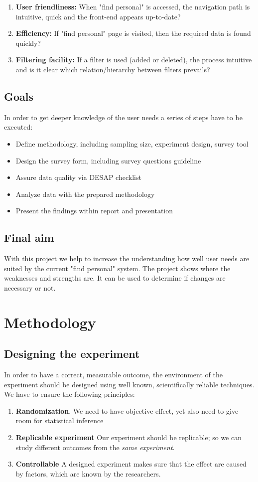 \documentclass[12pt,a4paper,paper=a4,oneside,titlepage,pdftex]{scrartcl}
\begin{document}
\begin{enumerate}
	\item \textbf{User friendliness:} When "find personal" is accessed, the navigation path is intuitive, quick and the front-end appears up-to-date?
	\item \textbf{Efficiency:} If "find personal" page is visited, then the required data is found quickly?
	\item \textbf{Filtering facility:} If a filter is used (added or deleted), the process intuitive and is it clear which relation/hierarchy between filters prevails?
\end{enumerate}

\subsection{Goals}
In order to get deeper knowledge of the user needs a series of steps have to be executed:
\begin{itemize}
	\item Define methodology, including sampling size, experiment design, survey tool
	\item Design the survey form, including survey questions guideline
	\item Assure data quality via DESAP checklist
	\item Analyze data with the prepared methodology
	\item Present the findings within report and presentation
\end{itemize}

\subsection{Final aim}
With this project we help to increase the understanding how well user needs are suited by the current "find personal" system. The project shows where the weaknesses and strengths are. It can be used to determine if changes are necessary or not.

\section{Methodology}

\subsection{Designing the experiment}
In order to have a correct, measurable outcome, the environment of the experiment should be designed using well known, scientifically reliable techniques. We have to ensure the following principles:
\begin{enumerate}
\item \textbf{Randomization}.  We need to have objective effect, yet also need to give room for statistical inference
\item\textbf{Replicable experiment} Our experiment should be replicable; so we can study different outcomes from the \textit{same experiment}.
\item \textbf{Controllable} A designed experiment makes sure that the effect are caused by factors, which are known by the researchers.
\end{enumerate}
\end{document}
